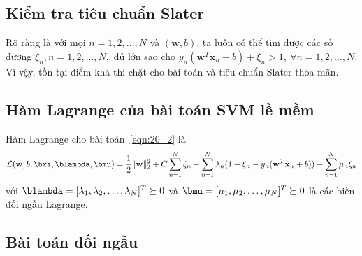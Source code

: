  
\subsection{Kiểm tra tiêu chuẩn Slater}
 
Rõ ràng là với mọi $n = 1, 2, \dots, N$ và $(\mathbf{w}, b)$, ta luôn có thể tìm được các số {dương} $\xi_n, n = 1, 2, \dots, N,$ đủ lớn sao cho
\begin{math} 
y_n(\mathbf{w}^T\mathbf{x}_n + b) + \xi_n > 1, ~\forall n = 1, 2, \dots, N 
\end{math}.
Vì vậy, tồn tại điểm khả thi chặt cho bài toán và tiêu chuẩn Slater thỏa mãn. 
 
 
\subsection{Hàm Lagrange của bài toán SVM lề mềm}
Hàm Lagrange cho bài toán~\eqref{eqn:20_2} là
\begin{equation} 
\label{eqn:20_3}
\mathcal{L}(\mathbf{w}, b, \bxi, \blambda, \bmu) =
\frac{1}{2}{\|\mathbf{w}\|_2^2} + C \sum_{n=1}^N \xi_n + \sum_{n=1}^N \lambda_n ( 1 - \xi_n - y_n(\mathbf{w}^T\mathbf{x}_n + b)) - \sum_{n=1}^N \mu_n \xi_n
\end{equation} 
với $\blambda = [\lambda_1, \lambda_2, \dots, \lambda_N]^T \succeq 0$ và $\bmu =
[\mu_1, \mu_2, \dots, \mu_N]^T \succeq 0$ là các biến đối ngẫu Lagrange.
 
 
\subsection{Bài toán đối ngẫu }
 
